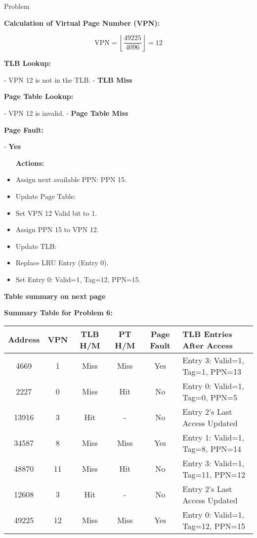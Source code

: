 \begin{problem}{}{Problem}
\begin{enumerate}[label=\arabic*.]
		\textbf{Calculation of Virtual Page Number (VPN):}
		
		\[
		\text{VPN} = \left\lfloor \dfrac{49225}{4096} \right\rfloor = 12
		\]
		
		\textbf{TLB Lookup:}
		
		- VPN 12 is not in the TLB.
		- \textbf{TLB Miss}
		
		\textbf{Page Table Lookup:}
		
		- VPN 12 is invalid.
		- \textbf{Page Table Miss}
		
		\textbf{Page Fault:}
		
		- \textbf{Yes}
		
	\begin{itemize} 
		\item [\textbf{Actions:}]
		\item Assign next available PPN: PPN 15.
		\item Update Page Table:
		\item Set VPN 12 Valid bit to 1.
		\item Assign PPN 15 to VPN 12.
		\item Update TLB:
		\item Replace LRU Entry (Entry 0).
		\item Set Entry 0: Valid=1, Tag=12, PPN=15.
	\end{itemize}
	\end{enumerate}
\textbf{Table summary on next page}
\end{problem}
\newpage
	\textbf{Summary Table for Problem 6:}
\begin{center}
	\begin{tabular}{|c|c|c|c|c|l|}
		\hline
		\textbf{Address} & \textbf{VPN} & \textbf{TLB H/M} & \textbf{PT H/M} & \textbf{Page Fault} & \textbf{TLB Entries After Access} \\
		\hline
		4669 & 1 & Miss & Miss & Yes & Entry 3: Valid=1, Tag=1, PPN=13 \\
		\hline
		2227 & 0 & Miss & Hit & No & Entry 0: Valid=1, Tag=0, PPN=5 \\
		\hline
		13916 & 3 & Hit & - & No & Entry 2's Last Access Updated \\
		\hline
		34587 & 8 & Miss & Miss & Yes & Entry 1: Valid=1, Tag=8, PPN=14 \\
		\hline
		48870 & 11 & Miss & Hit & No & Entry 3: Valid=1, Tag=11, PPN=12 \\
		\hline
		12608 & 3 & Hit & - & No & Entry 2's Last Access Updated \\
		\hline
		49225 & 12 & Miss & Miss & Yes & Entry 0: Valid=1, Tag=12, PPN=15 \\
		\hline
	\end{tabular}
\end{center}

	
	
	
	
	
	
